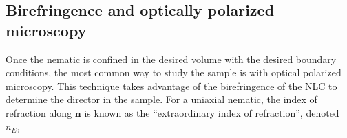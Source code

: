 \subsection{Birefringence and optically polarized microscopy}
Once the nematic is confined in the desired volume with the desired boundary conditions, the most common way to study the sample is with optical polarized microscopy.
This technique takes advantage of the birefringence of the NLC to determine the director in the sample.
For a uniaxial nematic, the index of refraction along $\mathbf{n}$ is known as the ``extraordinary index of refraction'', denoted $n_E$,
